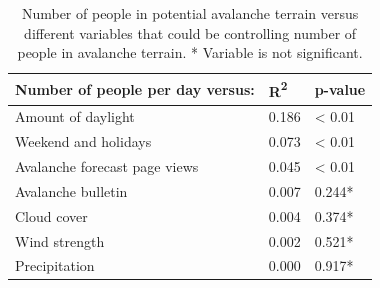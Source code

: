 \documentclass[authordate,empirical, issue]{jote-new-article}
\begin{document}
\begin{table}
  \begin{fullwidth}
    \caption{Number of people in potential avalanche terrain versus different variables that could be controlling number of people in avalanche terrain. * Variable is not significant.}

    \centering
    \begin{tabular}{@{} l l l  @{}}
      \toprule
      \textbf{Number of people per day versus:} &
      \textbf{R}{\textsuperscript{\textbf{2}}}
                                                & \textbf{p-value}   \\
      \midrule

      Amount of daylight                        & 0.186            &
      < 0.01                                                         \\

      Weekend and holidays                      & 0.073            &
      < 0.01                                                         \\

      Avalanche forecast page views             & 0.045            &
      < 0.01                                                         \\

      Avalanche bulletin                        & 0.007            &
      0.244*                                                         \\

      Cloud cover                               & 0.004            &
      0.374*                                                         \\

      Wind strength                             & 0.002            &
      0.521*                                                         \\

      Precipitation                             & 0.000            &
      0.917*                                                         \\
      \bottomrule
    \end{tabular}
  \end{fullwidth}
\end{table}
\end{document}
